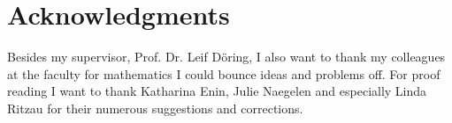 
\chapter*{Acknowledgments}
    
Besides my supervisor, Prof. Dr. Leif Döring, I also want to thank my colleagues
at the faculty for mathematics I could bounce ideas and problems off. For proof
reading I want to thank Katharina Enin, Julie Naegelen and especially Linda
Ritzau for their numerous suggestions and corrections.


\endinput